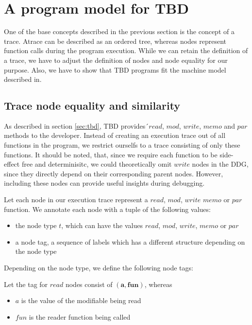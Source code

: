 \section{A program model for TBD}
One of the base concepts described in the previous section is the concept of a trace. Atrace can be described as an ordered tree, whereas nodes represent function calls during the program execution. While we can retain the definition of a trace, we have to adjust the definition of nodes and node equality for our purpose. Also, we have to show that TBD programs fit the machine model described in\cite{Acar2005thesis}.

\subsection{Trace node equality and similarity}
\label{sec:node_equality}
As described in section \ref{sec:tbd}, TBD provides´$read$, $mod$, $write$, $memo$ and $par$ methods to the developer. Instead of creating an execution trace out of all  functions in the program, we restrict ourselfs to a trace consisting of only these functions. It should be noted, that, since we require each function to be side-effect free and determinisitc, we could theoretically omit $write$ nodes in the DDG, since they directly depend on their corresponding parent nodes. However, including these nodes can provide useful insights during debugging. 

\begin{definition}
Let each node in our execution trace represent a $read$, $mod$, $write$ $memo$ or $par$ function. We annotate each node with a tuple of the following values:
\begin{itemize}
\item the node type $t$, which can have the values $read$, $mod$, $write$, $memo$ or $par$
\item a node tag, a sequence of labels which has a different structure depending on the node type 
\end{itemize}
\end{definition}

Depending on the node type, we define the following node tags: 

\begin{definition}
Let the tag for $read$ nodes consist of $\mathbf{(a, fun)}$, whereas
\begin{itemize}
\item $a$ is the value of the modifiable being read
\item $fun$ is the reader function being called
\end{itemize}
\end{definition}

